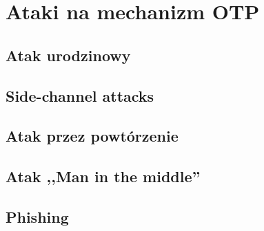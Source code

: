 \chapter{Ataki na mechanizm OTP}

\section{Atak urodzinowy}
\section{Side-channel attacks}
\section{Atak przez powtórzenie}
\section{Atak ,,Man in the middle''}
\section{Phishing}
